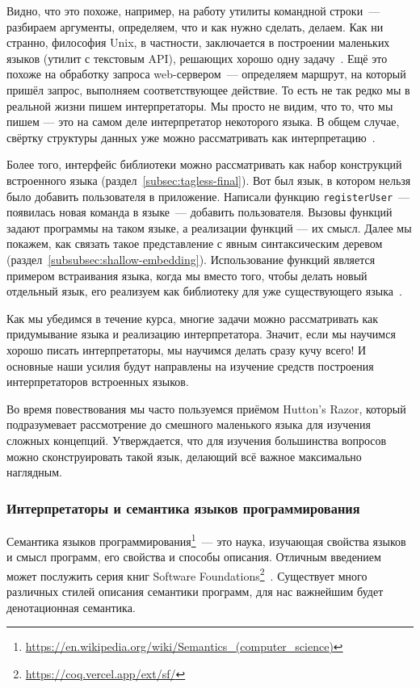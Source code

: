 Видно, что это похоже, например, на работу утилиты командной строки~--- разбираем аргументы, определяем, что и как нужно сделать, делаем.
Как ни странно, философия Unix, в частности, заключается в построении маленьких языков (утилит с текстовым API), решающих хорошо одну задачу~\cite{bentley1986little}.
Ещё это похоже на обработку запроса web-сервером~--- определяем маршрут, на который пришёл запрос, выполняем соответствующее действие.
То есть не так редко мы в реальной жизни пишем интерпретаторы.
Мы просто не видим, что то, что мы пишем --- это на самом деле интерпретатор некоторого языка.
В общем случае, свёртку структуры данных уже можно рассматривать как интерпретацию~\cite{gibbons2014folding}.

Более того, интерфейс библиотеки можно рассматривать как набор конструкций встроенного языка (раздел~\ref{subsec:tagless-final}).
Вот был язык, в котором нельзя было добавить пользователя в приложение.
Написали функцию \texttt{registerUser}~--- появилась новая команда в языке~--- добавить пользователя.
Вызовы функций задают программы на таком языке, а реализации функций --- их смысл.
Далее мы покажем, как связать такое представление с явным синтаксическим деревом (раздел~\ref{subsubsec:shallow-embedding}).
Использование функций является примером встраивания языка, когда мы вместо того, чтобы делать новый отдельный язык, его реализуем как библиотеку для уже существующего языка~\cite{gibbons2013functional}.

Как мы убедимся в течение курса, многие задачи можно рассматривать как придумывание языка и реализацию интерпретатора.
Значит, если мы научимся хорошо писать интерпретаторы, мы научимся делать сразу кучу всего!
И основные наши усилия будут направлены на изучение средств построения интерпретаторов встроенных языков.

Во время повествования мы часто пользуемся приёмом Hutton's Razor, который подразумевает рассмотрение до смешного маленького языка для изучения сложных концепций.
Утверждается, что для изучения большинства вопросов можно сконструировать такой язык, делающий всё важное максимально наглядным.

\subsubsection{Интерпретаторы и семантика языков программирования} \label{subsubsec:semantics}

Семантика языков программирования\footnote{\url{https://en.wikipedia.org/wiki/Semantics_(computer_science)}\label{note:sema-wiki}}~--- это наука, изучающая свойства языков и смысл программ, его свойства и способы описания.
Отличным введением может послужить серия книг Software Foundations\footnote{\url{https://coq.vercel.app/ext/sf/}}~\cite{pierce2010software}.
Существует много различных стилей описания семантики программ, для нас важнейшим будет денотационная семантика.

